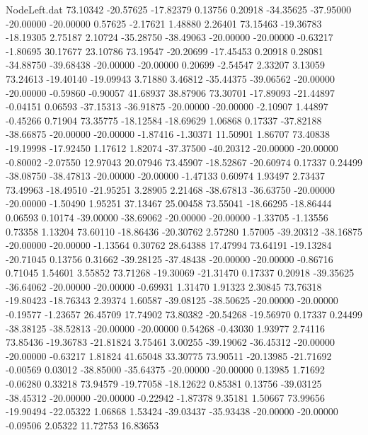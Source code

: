\begin{filecontents}{NodeLeft.dat}
  73.10342  -20.57625  -17.82379     0.13756    0.20918  -34.35625  -37.95000  -20.00000  -20.00000    0.57625   -2.17621    1.48880    2.26401
  73.15463  -19.36783  -18.19305     2.75187    2.10724  -35.28750  -38.49063  -20.00000  -20.00000   -0.63217   -1.80695   30.17677   23.10786
  73.19547  -20.20699  -17.45453     0.20918    0.28081  -34.88750  -39.68438  -20.00000  -20.00000    0.20699   -2.54547    2.33207    3.13059
  73.24613  -19.40140  -19.09943     3.71880    3.46812  -35.44375  -39.06562  -20.00000  -20.00000   -0.59860   -0.90057   41.68937   38.87906
  73.30701  -17.89093  -21.44897    -0.04151    0.06593  -37.15313  -36.91875  -20.00000  -20.00000   -2.10907    1.44897   -0.45266    0.71904
  73.35775  -18.12584  -18.69629     1.06868    0.17337  -37.82188  -38.66875  -20.00000  -20.00000   -1.87416   -1.30371   11.50901    1.86707
  73.40838  -19.19998  -17.92450     1.17612    1.82074  -37.37500  -40.20312  -20.00000  -20.00000   -0.80002   -2.07550   12.97043   20.07946
  73.45907  -18.52867  -20.60974     0.17337    0.24499  -38.08750  -38.47813  -20.00000  -20.00000   -1.47133    0.60974    1.93497    2.73437
  73.49963  -18.49510  -21.95251     3.28905    2.21468  -38.67813  -36.63750  -20.00000  -20.00000   -1.50490    1.95251   37.13467   25.00458
  73.55041  -18.66295  -18.86444     0.06593    0.10174  -39.00000  -38.69062  -20.00000  -20.00000   -1.33705   -1.13556    0.73358    1.13204
  73.60110  -18.86436  -20.30762     2.57280    1.57005  -39.20312  -38.16875  -20.00000  -20.00000   -1.13564    0.30762   28.64388   17.47994
  73.64191  -19.13284  -20.71045     0.13756    0.31662  -39.28125  -37.48438  -20.00000  -20.00000   -0.86716    0.71045    1.54601    3.55852
  73.71268  -19.30069  -21.31470     0.17337    0.20918  -39.35625  -36.64062  -20.00000  -20.00000   -0.69931    1.31470    1.91323    2.30845
  73.76318  -19.80423  -18.76343     2.39374    1.60587  -39.08125  -38.50625  -20.00000  -20.00000   -0.19577   -1.23657   26.45709   17.74902
  73.80382  -20.54268  -19.56970     0.17337    0.24499  -38.38125  -38.52813  -20.00000  -20.00000    0.54268   -0.43030    1.93977    2.74116
  73.85436  -19.36783  -21.81824     3.75461    3.00255  -39.19062  -36.45312  -20.00000  -20.00000   -0.63217    1.81824   41.65048   33.30775
  73.90511  -20.13985  -21.71692    -0.00569    0.03012  -38.85000  -35.64375  -20.00000  -20.00000    0.13985    1.71692   -0.06280    0.33218
  73.94579  -19.77058  -18.12622     0.85381    0.13756  -39.03125  -38.45312  -20.00000  -20.00000   -0.22942   -1.87378    9.35181    1.50667
  73.99656  -19.90494  -22.05322     1.06868    1.53424  -39.03437  -35.93438  -20.00000  -20.00000   -0.09506    2.05322   11.72753   16.83653

\end{filecontents}
